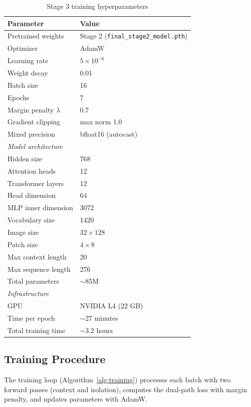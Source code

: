 \documentclass[11pt, a4paper]{article}
\begin{document}
\begin{table}[h]
\centering
\caption{Stage 3 training hyperparameters}
\label{tab:hyperparams}
\begin{tabular}{ll}
\toprule
\textbf{Parameter} & \textbf{Value} \\
\midrule
Pretrained weights & Stage 2 (\texttt{final\_stage2\_model.pth}) \\
Optimizer & AdamW \\
Learning rate & $5 \times 10^{-6}$ \\
Weight decay & 0.01 \\
Batch size & 16 \\
Epochs & 7 \\
Margin penalty $\lambda$ & 0.7 \\
Gradient clipping & max norm 1.0 \\
Mixed precision & bfloat16 (autocast) \\
\midrule
\multicolumn{2}{l}{\textit{Model architecture}} \\
Hidden size & 768 \\
Attention heads & 12 \\
Transformer layers & 12 \\
Head dimension & 64 \\
MLP inner dimension & 3072 \\
Vocabulary size & 1420 \\
Image size & $32 \times 128$ \\
Patch size & $4 \times 8$ \\
Max context length & 20 \\
Max sequence length & 276 \\
Total parameters & $\sim$85M \\
\midrule
\multicolumn{2}{l}{\textit{Infrastructure}} \\
GPU & NVIDIA L4 (22 GB) \\
Time per epoch & $\sim$27 minutes \\
Total training time & $\sim$3.2 hours \\
\bottomrule
\end{tabular}
\end{table}

\subsection{Training Procedure}

The training loop (Algorithm~\ref{alg:training}) processes each batch with two forward passes (context and isolation), computes the dual-path loss with margin penalty, and updates parameters with AdamW.
\end{document}
